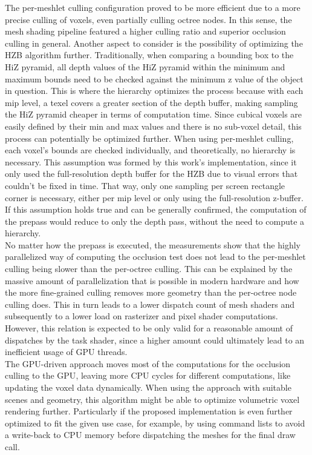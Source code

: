 \noindent
The per-meshlet culling configuration proved to be more efficient due to a more precise culling of voxels, even partially culling octree nodes.
In this sense, the mesh shading pipeline featured a higher culling ratio and superior occlusion culling in general. Another aspect to consider 
is the possibility of optimizing the \ac{HZB} algorithm further. Traditionally, when comparing a bounding box to the \ac{HiZ} pyramid, all depth 
values of the \ac{HiZ} pyramid within the minimum and maximum bounds need to be checked against the minimum z value of the object in question.
This is where the hierarchy optimizes the process because with each mip level, a texel covers a greater section of the depth buffer, making 
sampling the \ac{HiZ} pyramid cheaper in terms of computation time. Since cubical voxels are easily defined by their min and max values and 
there is no sub-voxel detail, this process can potentially be optimized further. When using per-meshlet culling, each voxel's bounds are 
checked individually, and theoretically, no hierarchy is necessary. This assumption was formed by this work's implementation, since it only used 
the full-resolution depth buffer for the \ac{HZB} due to visual errors that couldn't be fixed in time. That way, only one sampling per screen 
rectangle corner is necessary, either per mip level or only using the full-resolution z-buffer. If this assumption holds true and can be 
generally confirmed, the computation of the prepass would reduce to only the depth pass, without the need to compute a hierarchy. \\

\noindent
No matter how the prepass is executed, the measurements show that the highly parallelized way of computing the occlusion test does not lead to 
the per-meshlet culling being slower than the per-octree culling. This can be explained by the massive amount of parallelization that is 
possible in modern hardware and how the more fine-grained culling removes more geometry than the per-octree node culling does. This in turn leads 
to a lower dispatch count of mesh shaders and subsequently to a lower load on rasterizer and pixel shader computations. However, this relation 
is expected to be only valid for a reasonable amount of dispatches by the task shader, since a higher amount could ultimately lead to an inefficient 
usage of \ac{GPU} threads. \\

\noindent
The \ac{GPU}-driven approach moves most of the computations for the occlusion culling to the \ac{GPU}, leaving more \ac{CPU} cycles for different 
computations, like updating the voxel data dynamically. When using the approach with suitable scenes and geometry, this algorithm might be able 
to optimize volumetric voxel rendering further. Particularly if the proposed implementation is even further optimized to fit the given use case, 
for example, by using command lists to avoid a write-back to \ac{CPU} memory before dispatching the meshes for the final draw call. \\



